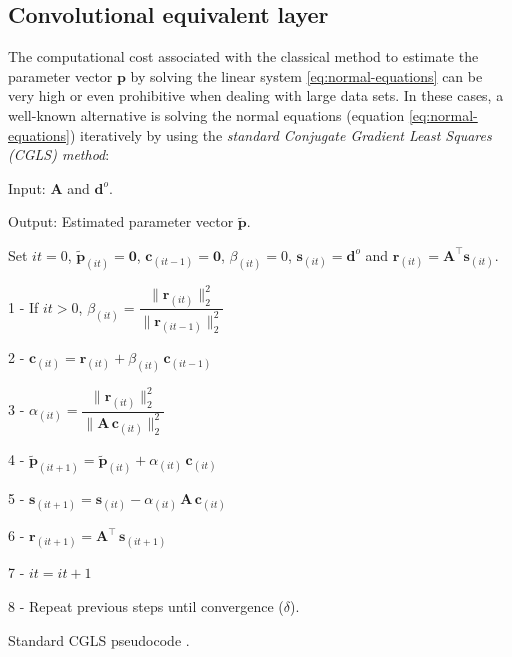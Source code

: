 \documentclass[manuscript]{geophysics}
\providecommand{\DIFaddtex}[1]{{\protect\color{blue}\uwave{#1}}} %
\providecommand{\DIFdeltex}[1]{{\protect\color{red}\sout{#1}}}                      %
\providecommand{\DIFaddbegin}{} %
\providecommand{\DIFaddend}{} %
\providecommand{\DIFdelbegin}{} %
\providecommand{\DIFdelend}{} %
\providecommand{\DIFadd}[1]{\texorpdfstring{\DIFaddtex{#1}}{#1}} %
\providecommand{\DIFdel}[1]{\texorpdfstring{\DIFdeltex{#1}}{}} %
\begin{document}
\subsection{Convolutional equivalent layer}

The computational cost associated with the classical method to estimate the parameter 
vector $\mathbf{p}$ by solving the linear system \ref{eq:normal-equations} can be very high 
or even prohibitive when dealing with large data sets. In these cases, a well-known alternative
is solving the normal equations (equation \ref{eq:normal-equations}) iteratively by 
using the \textit{standard Conjugate Gradient Least Squares (CGLS) method}:

\begin{algorithm}[H]
	Input: $\mathbf{A}$ and $\mathbf{d}^{o}$.

	Output: Estimated parameter vector $\tilde{\mathbf{p}}$.

	Set $it = 0$, $\tilde{\mathbf{p}}_{(it)} = \mathbf{0}$, $\mathbf{c}_{(it-1)} = \mathbf{0}$, $\beta_{(it)} = 0$, $\mathbf{s}_{(it)} = \mathbf{d}^{o}$ and $\mathbf{r}_{(it)} = \mathbf{A}^{\top} \mathbf{s}_{(it)}$.

	1 - If $it > 0$, $\beta_{(it)} = \dfrac{\| \mathbf{r}_{(it)} \|_{2}^{2}}{\| \mathbf{r}_{(it - 1)} \|_{2}^{2}}$

	2 - $\mathbf{c}_{(it)} = \mathbf{r}_{(it)} + \beta_{(it)} \, \mathbf{c}_{(it - 1)}$

	3 - $\alpha_{(it)} = \dfrac{{\| \mathbf{r}_{(it)}\|_{2}^{2}}}{\| \mathbf{A} \, \mathbf{c}_{(it)} \|_{2}^{2}}$

	4 - $\tilde{\mathbf{p}}_{(it + 1)} = \tilde{\mathbf{p}}_{(it)} + \alpha_{(it)} \, \mathbf{c}_{(it)}$

	5 - $\mathbf{s}_{(it + 1)} = \mathbf{s}_{(it)} - \alpha_{(it)} \, \mathbf{A} \, \mathbf{c}_{(it)}$

	6 - $\mathbf{r}_{(it + 1)} = \mathbf{A}^{\top} \, \mathbf{s}_{(it + 1)}$

	7 - $it = it + 1$

	8 - Repeat previous steps until convergence (\DIFdelbegin \DIFdel{$\delta$}\DIFdelend \DIFaddbegin \DIFadd{stops if $\delta = \dfrac{|\mathbf{r}_{(it + 1)} - \mathbf{r}_{(it)}|}{N} \leq 10^{-3}$}\DIFaddend ).

	\caption{Standard CGLS pseudocode \citep[][ p. 166]{aster2019parameter}.}
	\label{al:std-cgls-algorithm}
\end{algorithm}
\end{document}
